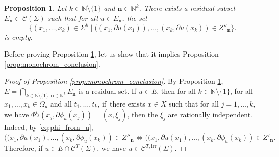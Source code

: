\documentclass[JEP,XML,SOM,Unicode,published]{cedram}
\let\mathcal\mathscr
\let\sep\mid
\newcommand{\irr}{\mathrm{irr}}
\theoremstyle{plain}
\newtheorem{proposition}[theorem]{Proposition}
\theoremstyle{definition}
\newcommand{\N}{\mathbb{N}}
\def\calC{\mathcal{C}}
\begin{document}
\begin{proposition}\label{prop:irrational_monochromatic}
Let $k\in \N \setminus \{1\}$ and $\boldsymbol{n}\in \N^k$. There exists a residual subset $E_{\boldsymbol{n}}\subset \calC(\Sigma)$ such that for all $u\in E_{\boldsymbol{n}}$, the set
\[
\bigl\{(x_1,\dots, x_k)\in \Sigma^k \sep ((x_1, \partial u(x_1)),\dots,(x_k, \partial u(x_k)) \in Z''_{\boldsymbol{n}} \bigr\}.
\]
is empty.
\end{proposition}

Before proving Proposition \ref{prop:irrational_monochromatic}, let us show that it implies Proposition \ref{prop:monochrom_conclusion}.
\begin{proof}[Proof of Proposition \ref{prop:monochrom_conclusion}]
By Proposition \ref{prop:irrational_monochromatic}, $E= \bigcap_{k\in \N\setminus\{1\}, \boldsymbol{n}\in \N^k} E_{\boldsymbol{n}}$ is a residual set. If $u\in E$, then for all $k\in \N\setminus\{1\}$, for all $x_1,\dots, x_k\in \Omega_u$ and all $t_1,\dots, t_k$, if~there exists $x\in X$ such that for all $j=1,\dots,k$, we have $\Phi^{t_j}(x_j, \partial \phi_u(x_j)) = (x,\xi_j)$, then the $\xi_j$ are rationally independent. Indeed, by \eqref{eq:phi_from_u},
\[
((x_1,\partial u(x_1),\dots,(x_k,\partial \phi_u(x_k))\in Z''_{\boldsymbol{n}}\iff ((x_1,\partial u(x_1),\dots,(x_k,\partial \phi_u(x_k))\in Z'_{\boldsymbol{n}}.
\]
Therefore, if $u\in E \cap \calC^T(\Sigma)$, we have $u\in \mathcal{C}^{T,\irr}(\Sigma)$.
\end{proof}
\end{document}
